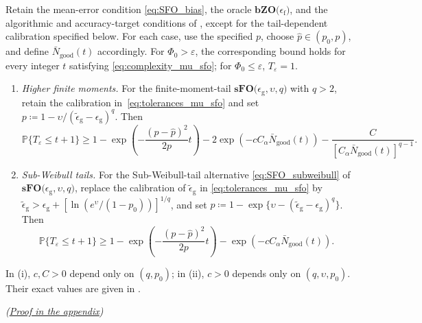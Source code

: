 \documentclass{article}
\begin{document}
\begin{corollary}
\label{cor:mu_pos_sfo_tail_refinements}
Retain the mean-error condition \eqref{eq:SFO_bias}, the oracle \(\textbf{bZO(}\epsilon_{\mathrm f}\textbf{)}\), and the algorithmic and accuracy-target conditions of , except for the tail-dependent calibration specified below.
 For each case, use the
specified \(p\), choose \(\hat p\in(p_0,p)\), and define
\(\bar N_{\mathrm{good}}(t)\) accordingly. For \(\Phi_0>\varepsilon\),
the corresponding bound holds for every integer \(t\) satisfying
\eqref{eq:complexity_mu_sfo}; for \(\Phi_0\le\varepsilon\), \(T_\varepsilon=1\).
\begin{enumerate}[label=\textnormal{(\roman*)},leftmargin=*]
\item\label{cor:sfo_higher_moment_reduction}
\emph{Higher finite moments.} For the finite-moment-tail \(\textbf{sFO(}\epsilon_{\mathrm g},\upsilon,q\textbf{)}\) with \(q>2\), retain the calibration in~\eqref{eq:tolerances_mu_sfo}
and set \(p\coloneqq 1-\upsilon/(\widetilde\epsilon_{\mathrm{g}}-\epsilon_{\mathrm{g}})^q\). Then
\begin{equation}\label{eq:probability_mu_sfo_high_moment}
\mathbb P\{T_\varepsilon\le t+1\}
\ge1-\exp\!\left(-\frac{(p-\hat p)^2}{2p}t\right)
-2\exp\!\left(-cC_\alpha\bar N_{\mathrm{good}}(t)\right)
-\frac{C}{[C_\alpha\bar N_{\mathrm{good}}(t)]^{q-1}}.
\end{equation}
\item
\emph{Sub-Weibull tails.}
For the Sub-Weibull-tail alternative \eqref{eq:SFO_subweibull} of \(\textbf{sFO(}\epsilon_{\mathrm g},\upsilon,q\textbf{)}\), replace the calibration of \(\widetilde\epsilon_{\mathrm g}\) in 
\eqref{eq:tolerances_mu_sfo} by
\(\widetilde\epsilon_{\mathrm{g}}>\epsilon_{\mathrm{g}}+
[\ln(e^\upsilon/(1-p_0))]^{1/q}\), and set
\(p\coloneqq 1-\exp\{\upsilon-(\widetilde\epsilon_{\mathrm{g}}-\epsilon_{\mathrm{g}})^q\}\).
Then
\begin{equation}\label{eq:probability_mu_sfo_subweibull}
\mathbb P\{T_\varepsilon\le t+1\}
\ge1-\exp\!\left(-\frac{(p-\hat p)^2}{2p}t\right)
-\exp\!\left(-cC_\alpha\bar N_{\mathrm{good}}(t)\right).
\end{equation}
\end{enumerate}
In \textnormal{(i)}, \(c,C>0\) depend only on \((q,p_0)\);
in \textnormal{(ii)}, \(c>0\) depends only on \((q,\upsilon,p_0)\).
Their exact values are given in .
\par\nobreak\hfill\textnormal{\small\itshape(\hyperref[proof:mu_pos_sfo_tail_refinements]{Proof in the appendix})}\par
\end{corollary}
\end{document}
